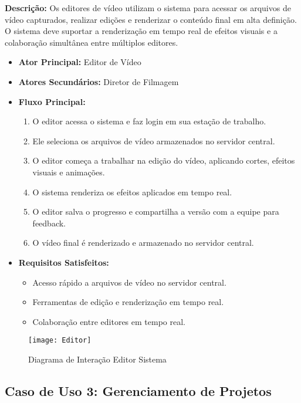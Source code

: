 \textbf{Descrição:} Os editores de vídeo utilizam o sistema para acessar os arquivos de vídeo capturados, realizar edições e renderizar o conteúdo final em alta definição. O sistema deve suportar a renderização em tempo real de efeitos visuais e a colaboração simultânea entre múltiplos editores.

\begin{itemize}
  \item \textbf{Ator Principal:} Editor de Vídeo
  \item \textbf{Atores Secundários:} Diretor de Filmagem
  \item \textbf{Fluxo Principal:}
    \begin{enumerate}
      \item O editor acessa o sistema e faz login em sua estação de trabalho.
      \item Ele seleciona os arquivos de vídeo armazenados no servidor central.
      \item O editor começa a trabalhar na edição do vídeo, aplicando cortes, efeitos visuais e animações.
      \item O sistema renderiza os efeitos aplicados em tempo real.
      \item O editor salva o progresso e compartilha a versão com a equipe para feedback.
      \item O vídeo final é renderizado e armazenado no servidor central.
    \end{enumerate}
  \item \textbf{Requisitos Satisfeitos:}
    \begin{itemize}
      \item Acesso rápido a arquivos de vídeo no servidor central.
      \item Ferramentas de edição e renderização em tempo real.
      \item Colaboração entre editores em tempo real.
    \end{itemize}
\end{itemize}

\begin{figure}[ht]
    \centering
    \texttt{[image: Editor]}
    \caption{Diagrama de Interação Editor Sistema}
    \label{fig:diagram1}
\end{figure}

\subsection{Caso de Uso 3: Gerenciamento de Projetos}

